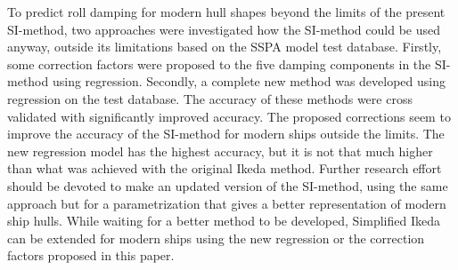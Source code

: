 To predict roll damping for modern hull shapes beyond the limits of the present SI-method, two approaches were investigated how the SI-method could be used anyway, outside its limitations based on the SSPA model test database.
Firstly, some correction factors were proposed to the five damping components in the SI-method using regression. Secondly, a complete new method was developed using regression on the test database. The accuracy of these methods were cross validated with significantly improved accuracy. The proposed corrections seem to improve the accuracy of the SI-method for modern ships outside the limits. The new regression model has the highest accuracy, but it is not that much higher than what was achieved with the original Ikeda method. Further research effort should be devoted to make an updated version of the SI-method, using the same approach but for a parametrization that gives a better representation of modern ship hulls. While waiting for a better method to be developed, Simplified Ikeda can be extended for modern ships using the new regression or the correction factors proposed in this paper. 




